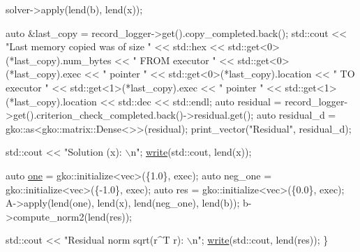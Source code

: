 \begin{DoxyCodeInclude}
    solver->apply(lend(b), lend(x));

    \textcolor{keyword}{auto} &last\_copy = record\_logger->get().copy\_completed.back();
    std::cout << \textcolor{stringliteral}{"Last memory copied was of size "} << std::hex
              << std::get<0>(*last\_copy).num\_bytes << \textcolor{stringliteral}{" FROM executor "}
              << std::get<0>(*last\_copy).exec << \textcolor{stringliteral}{" pointer "}
              << std::get<0>(*last\_copy).location << \textcolor{stringliteral}{" TO executor "}
              << std::get<1>(*last\_copy).exec << \textcolor{stringliteral}{" pointer "}
              << std::get<1>(*last\_copy).location << std::dec << std::endl;
    \textcolor{keyword}{auto} residual =
        record\_logger->get().criterion\_check\_completed.back()->residual.get();
    \textcolor{keyword}{auto} residual\_d = gko::as<gko::matrix::Dense<>>(residual);
    print\_vector(\textcolor{stringliteral}{"Residual"}, residual\_d);

    std::cout << \textcolor{stringliteral}{"Solution (x): \(\backslash\)n"};
    \hyperlink{namespacegko_a859dc47a462721d83728d91ab7fa2148}{write}(std::cout, lend(x));

    \textcolor{keyword}{auto} \hyperlink{namespacegko_a0059e27f8f4bc348ff65c1e60caf47c8}{one} = gko::initialize<vec>(\{1.0\}, exec);
    \textcolor{keyword}{auto} neg\_one = gko::initialize<vec>(\{-1.0\}, exec);
    \textcolor{keyword}{auto} res = gko::initialize<vec>(\{0.0\}, exec);
    A->apply(lend(one), lend(x), lend(neg\_one), lend(b));
    b->compute\_norm2(lend(res));

    std::cout << \textcolor{stringliteral}{"Residual norm sqrt(r^T r): \(\backslash\)n"};
    \hyperlink{namespacegko_a859dc47a462721d83728d91ab7fa2148}{write}(std::cout, lend(res));
\}
\end{DoxyCodeInclude}
 